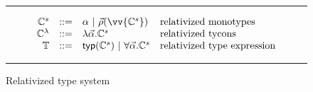 \begin{figure}
	\hrule
\[\begin{array}{rcll}
       \mathbb{C}^s & ::= &
         \alpha~|~\vec{\rho}(\vv{\mathbb{C}^s}) & \textrm{relativized monotypes}\\
       \mathbb{C}^\lambda & ::= & \lambda\vec{\alpha}.\mathbb{C}^s &
       \textrm{relativized tycons}\\

        \mathbb{T} & ::= &
        \mathsf{typ}(\mathbb{C}^s)~|~\forall\vec{\alpha}.\mathbb{C}^s & \textrm{relativized type expression}\\

\end{array}\]
\hrule
\caption{Relativized type system}
\label{fig:reltypesystem}
\end{figure}
